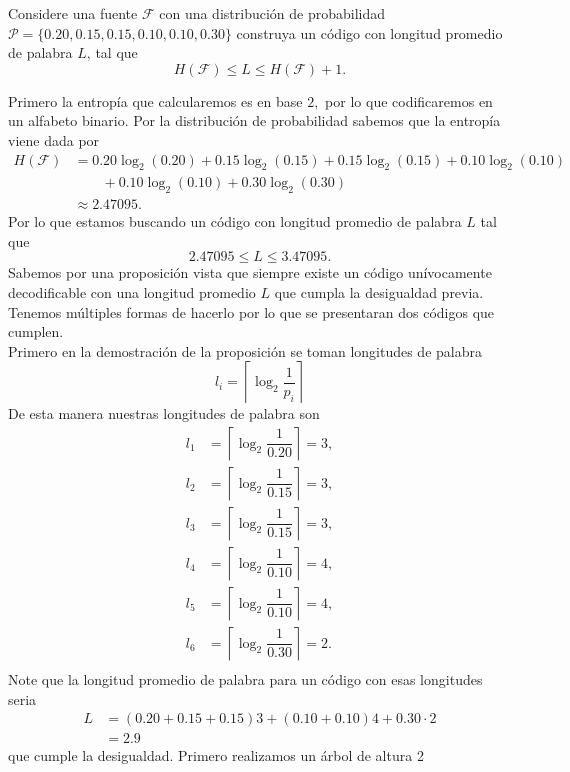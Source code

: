 
Considere una fuente $\mathcal{F}$ con una distribución  de probabilidad $\mathcal{P}=\{0\text{.}20,0\text{.}15,0\text{.}15,0\text{.}10,0\text{.}10,0\text{.}30\}$ construya un código con longitud promedio de palabra $L$, tal que
$$H(\mathcal{F})\leq L \leq H(\mathcal{F})+1.$$
\begin{sols}
 Primero la entropía que calcularemos es en base $2,$ por lo que codificaremos en un alfabeto binario. Por la distribución de probabilidad sabemos que la entropía viene dada por  
 \begin{align*}
  H(\mathcal{F})&=0.20\log_2(0.20)+0.15\log_2(0.15)+0.15\log_2(0.15)+0.10\log_2(0.10)\\
  &\phantom{++}+0.10\log_2(0.10)+0.30\log_2(0.30)\\
  &\approx 2.47095.
  \end{align*} 
  Por lo que estamos buscando un código con longitud promedio de palabra $L$ tal que
  $$2.47095\leq L\leq 3.47095.$$
  Sabemos por una proposición vista que siempre existe un código unívocamente decodificable con una longitud promedio $L$ que cumpla la desigualdad previa. Tenemos múltiples formas de hacerlo por lo que se presentaran dos códigos que cumplen.\\

  Primero en la demostración de la proposición se toman longitudes de palabra
  $$l_i=\left\lceil\log_2\dfrac{1}{p_i}\right\rceil$$
  De esta manera nuestras longitudes de palabra son
  \begin{align*}
        l_1&=\left\lceil\log_2\dfrac{1}{0.20}\right\rceil=3,\\
        l_2&=\left\lceil\log_2\dfrac{1}{0.15}\right\rceil=3,\\
        l_3&=\left\lceil\log_2\dfrac{1}{0.15}\right\rceil=3,\\
        l_4&=\left\lceil\log_2\dfrac{1}{0.10}\right\rceil=4,\\
        l_5&=\left\lceil\log_2\dfrac{1}{0.10}\right\rceil=4,\\
        l_6&=\left\lceil\log_2\dfrac{1}{0.30}\right\rceil=2.\\
  \end{align*}
  Note que la longitud promedio de palabra para un código con esas longitudes seria
  \begin{align*}
      L&=(0.20+0.15+0.15)3+(0.10+0.10)4+0.30\cdot 2\\
      &=2.9
  \end{align*}
  que cumple la desigualdad. Primero realizamos un árbol de altura 2
  \begin{center}
       \begin{tikzpicture}[level 1/.style={sibling distance=25mm}, level 2/.style={sibling distance=15mm}]


\end{tikzpicture}
\end{center}
\end{sols}

